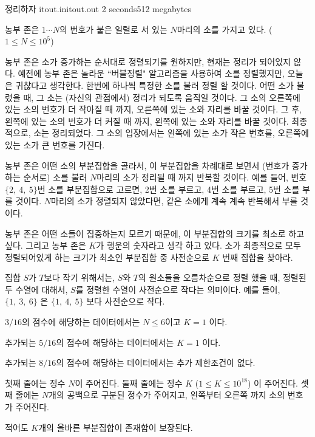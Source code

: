 \begin{problem}{정리하자}
	{itout.in}{itout.out}
	{2 seconds}{512 megabytes}{}
	
	농부 존은 $1 \cdots N$의 번호가 붙은 일렬로 서 있는 $N$마리의 소를 가지고 있다. ($1 \le N \le 10^5$)

	농부 존은 소가 증가하는 순서대로 정렬되기를 원하지만, 현재는 정리가 되어있지 않다. 예전에 농부 존은 놀라운 ``버블정렬" 알고리즘을 사용하여 소를 정렬했지만, 오늘은 귀찮다고 생각한다. 한번에 하나씩 특정한 소를 불러 정렬 할 것이다. 어떤 소가 불렸을 때, 그 소는 (자신의 관점에서) 정리가 되도록 움직일 것이다. 그 소의 오른쪽에 있는 소의 번호가 더 작아질 때 까지, 오른쪽에 있는 소와 자리를 바꿀 것이다. 그 후, 왼쪽에 있는 소의 번호가 더 커질 때 까지, 왼쪽에 있는 소와 자리를 바꿀 것이다. 최종적으로, 소는 정리되었다. 그 소의 입장에서는 왼쪽에 있는 소가 작은 번호를, 오른쪽에 있는 소가 큰 번호를 가진다.

	농부 존은 어떤 소의 부분집합을 골라서, 이 부분집합을 차례대로 보면서 (번호가 증가하는 순서로) 소를 불러 $N$마리의 소가 정리될 때 까지 반복할 것이다. 예를 들어, 번호 $\{2, \ 4, \ 5\}$번 소를 부분집합으로 고르면, 2번 소를 부르고, 4번 소를 부르고, 5번 소를 부를 것이다. $N$마리의 소가 정렬되지 않았다면, 같은 소에게 계속 계속 반복해서 부를 것이다.

	농부 존은 어떤 소들이 집중하는지 모르기 때문에, 이 부분집합의 크기를 최소로 하고 싶다. 그리고 농부 존은 $K$가 행운의 숫자라고 생각 하고 있다. 소가 최종적으로 모두 정렬되어있게 하는 크기가 최소인 부분집합 중 사전순으로 $K$ 번째 집합을 찾아라.

	집합 $S$가 $T$보다 작기 위해서는, $S$와 $T$의 원소들을 오름차순으로 정렬 했을 때, 정렬된 두 수열에 대해서, $S$를 정렬한 수열이 사전순으로 작다는 의미이다. 예를 들어, $\{1,\ 3,\ 6\}$ 은 $\{1, \ 4,\ 5\}$ 보다 사전순으로 작다.

	\Scoring

	$3/16$의 점수에 해당하는 데이터에서는 $N \le 6$이고 $K=1$ 이다.
	
	추가되는 $5/16$의 점수에 해당하는 데이터에서는 $K=1$ 이다.
	
	추가되는 $8/16$의 점수에 해당하는 데이터에서는 추가 제한조건이 없다.
	
	\InputFile

	첫째 줄에는 정수 $N$이 주어진다. 둘째 줄에는 정수 $K$ ($1 \le K \le 10^{18}$) 이 주어진다. 셋째 줄에는 $N$개의 공백으로 구분된 정수가 주어지고, 왼쪽부터 오른쪽 까지 소의 번호가 주어진다.

	적어도 $K$개의 올바른 부분집합이 존재함이 보장된다.
	

\end{problem}
